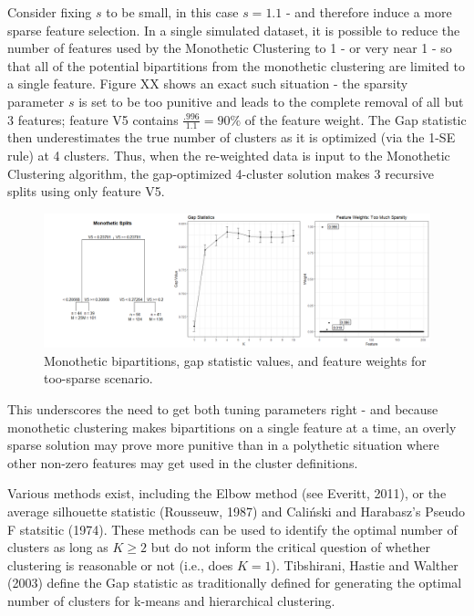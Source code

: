 \documentclass[
]{article}
\begin{document}
Consider fixing \(s\) to be small, in this case \(s = 1.1\) - and
therefore induce a more sparse feature selection. In a single simulated
dataset, it is possible to reduce the number of features used by the
Monothetic Clustering to 1 - or very near 1 - so that all of the
potential bipartitions from the monothetic clustering are limited to a
single feature. Figure XX shows an exact such situation - the sparsity
parameter \(s\) is set to be too punitive and leads to the complete
removal of all but 3 features; feature V5 contains
\(\frac{.996}{1.1} = 90\%\) of the feature weight. The Gap statistic
then underestimates the true number of clusters as it is optimized (via
the 1-SE rule) at 4 clusters. Thus, when the re-weighted data is input
to the Monothetic Clustering algorithm, the gap-optimized 4-cluster
solution makes 3 recursive splits using only feature V5.

\begin{figure}
\includegraphics[width=0.9\linewidth]{TooSparseExample} \caption{Monothetic bipartitions, gap statistic values, and feature weights for too-sparse scenario.}\label{fig:ExTooSparse}
\end{figure}

This underscores the need to get both tuning parameters right - and
because monothetic clustering makes bipartitions on a single feature at
a time, an overly sparse solution may prove more punitive than in a
polythetic situation where other non-zero features may get used in the
cluster definitions.

Various methods exist, including the Elbow method (see Everitt, 2011),
or the average silhouette statistic (Rousseuw, 1987) and Caliński and
Harabasz's Pseudo F statsitic (1974). These methods can be used to
identify the optimal number of clusters as long as \(K \geq 2\) but do
not inform the critical question of whether clustering is reasonable or
not (i.e., does \(K = 1\)). Tibshirani, Hastie and Walther (2003) define
the Gap statistic as traditionally defined for generating the optimal
number of clusters for k-means and hierarchical clustering.
\end{document}
